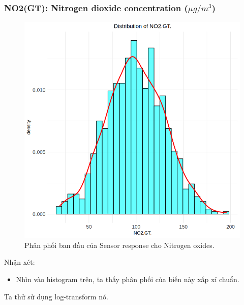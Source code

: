 \subsubsection{NO2(GT): Nitrogen dioxide concentration ($\mu g/ m^3$)}

\begin{figure}[H]
    \centering
    \includegraphics[width=0.75\columnwidth]{air_figures/NO2(GT)_original_distribution.png}
    \caption{Phân phối ban đầu của Sensor response cho Nitrogen oxides.}
    \label{fig:no2_original_distribution}
\end{figure}

Nhận xét:
\begin{itemize}
    \item Nhìn vào histogram trên, ta thấy phân phối của biến này xấp xỉ chuẩn.
\end{itemize}

Ta thử sử dụng log-transform nó.

